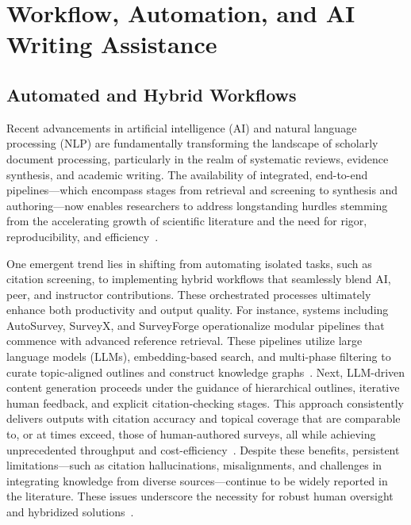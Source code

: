 \documentclass[sigconf]{acmart}
\begin{document}
\section{Workflow, Automation, and AI Writing Assistance}

\subsection{Automated and Hybrid Workflows}

Recent advancements in artificial intelligence (AI) and natural language processing (NLP) are fundamentally transforming the landscape of scholarly document processing, particularly in the realm of systematic reviews, evidence synthesis, and academic writing. The availability of integrated, end-to-end pipelines—which encompass stages from retrieval and screening to synthesis and authoring—now enables researchers to address longstanding hurdles stemming from the accelerating growth of scientific literature and the need for rigor, reproducibility, and efficiency~\cite{ref10,ref11,ref12,ref28,ref29,ref30,ref31,ref35,ref36,ref37,ref38,ref39,ref46,ref47,ref49,ref51,ref62,ref76,ref80,ref86,ref88,ref89,ref90,ref91,ref94,ref96,ref97,ref98,ref102,ref108}.

One emergent trend lies in shifting from automating isolated tasks, such as citation screening, to implementing hybrid workflows that seamlessly blend AI, peer, and instructor contributions. These orchestrated processes ultimately enhance both productivity and output quality. For instance, systems including AutoSurvey, SurveyX, and SurveyForge operationalize modular pipelines that commence with advanced reference retrieval. These pipelines utilize large language models (LLMs), embedding-based search, and multi-phase filtering to curate topic-aligned outlines and construct knowledge graphs~\cite{ref10,ref12,ref35,ref76}. Next, LLM-driven content generation proceeds under the guidance of hierarchical outlines, iterative human feedback, and explicit citation-checking stages. This approach consistently delivers outputs with citation accuracy and topical coverage that are comparable to, or at times exceed, those of human-authored surveys, all while achieving unprecedented throughput and cost-efficiency~\cite{ref10,ref12,ref29,ref35,ref46,ref51}. Despite these benefits, persistent limitations—such as citation hallucinations, misalignments, and challenges in integrating knowledge from diverse sources—continue to be widely reported in the literature. These issues underscore the necessity for robust human oversight and hybridized solutions~\cite{ref10,ref11,ref35,ref39,ref46,ref47,ref51,ref62}.
\end{document}
